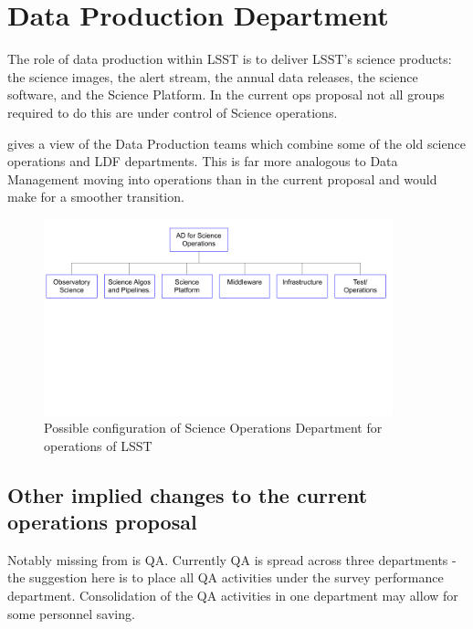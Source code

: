 
\section{Data Production Department }\label{sec:sciops} \label{sec:dataprod}

The role of data production within \gls{LSST} is to deliver \gls{LSST}'s science products: the science images, the alert stream, the annual data releases, the science \gls{software}, and the Science Platform. In the current ops proposal not all groups required to do this are under control of Science operations.

 gives a view of the Data Production teams which combine some of the old science operations  and LDF departments. This is far more analogous to Data Management moving into operations than in the current proposal and would make for a smoother transition.

\begin{figure}
\includegraphics[width=0.9\textwidth]{figures/SciOpsOrg}
\caption{Possible configuration of Science Operations Department for operations of \gls{LSST} \label{fig:sciopsorg}}
\end{figure}




\subsection{Other implied changes to the current operations proposal}
Notably missing from  is \gls{QA}. Currently \gls{QA} is spread across  three
 departments - the suggestion here is to place all \gls{QA} activities under the survey performance department. Consolidation
of the \gls{QA} activities in one department may allow for some personnel saving.

